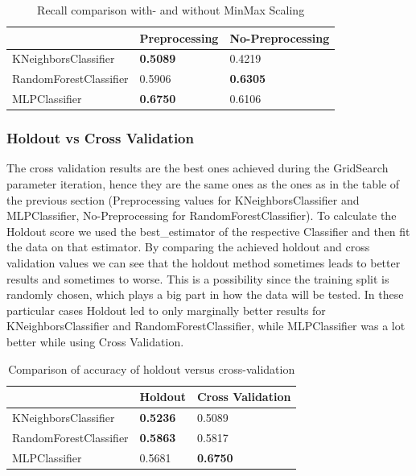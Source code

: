 
\begin{table}[h]
\begin{center}
\begin{tabular}{|l|l|l|}
\hline
                       & Preprocessing & No-Preprocessing \\ \hline
KNeighborsClassifier   & \textbf{0.5089}        & 0.4219          \\ \hline
RandomForestClassifier & 0.5906        & \textbf{0.6305}           \\ \hline
MLPClassifier          & \textbf{0.6750}        & 0.6106           \\ \hline
\end{tabular}
\caption{Recall comparison with- and without MinMax Scaling}
\label{tab:onl_pre_no_pre}
\end{center}
\end{table}

\subsubsection{Holdout vs Cross Validation}
The cross validation results are the best ones achieved during the GridSearch parameter iteration, hence they are the same ones as the ones as in the table of the previous section (Preprocessing values for KNeighborsClassifier and MLPClassifier, No-Preprocessing for RandomForestClassifier). To calculate the Holdout score we used the best\_estimator of the respective Classifier and then fit the data on that estimator. 
By comparing the achieved holdout and cross validation values we can see that the holdout method sometimes leads to better results and sometimes to worse. This is a possibility since the training split is randomly chosen, which plays a big part in how the data will be tested. In these particular cases Holdout led to only marginally better results for KNeighborsClassifier and RandomForestClassifier, while MLPClassifier was a lot better while using Cross Validation. 

\begin{table}[h]
\begin{center}
\begin{tabular}{|l|l|l|}
\hline
                       & Holdout & Cross Validation \\ \hline
KNeighborsClassifier   & \textbf{0.5236}  & 0.5089           \\ \hline
RandomForestClassifier & \textbf{0.5863}  & 0.5817           \\ \hline
MLPClassifier          & 0.5681  & \textbf{0.6750}           \\ \hline
\end{tabular}
\caption{Comparison of accuracy of holdout versus cross-validation}
\end{center}
\end{table}

